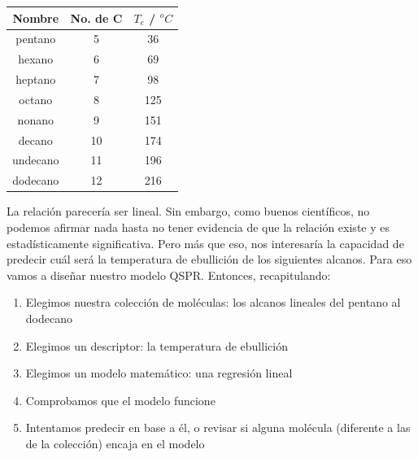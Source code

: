\documentclass[10pt,letterpaper]{article}
\begin{document}
\begin{center}
\begin{tabular}{ccc}
\hline
\textbf{Nombre} & \textbf{No. de C} & \textbf{$T_{e}$ / $^o C$}\\
\hline
pentano & 5 & 36\\
hexano & 6 & 69\\
heptano & 7 & 98\\
octano & 8 & 125\\
nonano & 9 & 151\\
decano & 10 & 174\\
undecano & 11 & 196\\
dodecano & 12 & 216\\
\hline
\end{tabular}
\end{center}

La relaci\'on parecer\'ia ser lineal. Sin embargo, como buenos cient\'ificos, no podemos afirmar nada hasta no tener evidencia de que la relaci\'on existe y es estad\'isticamente significativa. Pero m\'as que eso, nos interesar\'ia la capacidad de predecir cu\'al ser\'a la temperatura de ebullici\'on de los siguientes alcanos. Para eso vamos a dise\~nar nuestro modelo QSPR. Entonces, recapitulando:

\begin{enumerate}
\item Elegimos nuestra colecci\'on de mol\'eculas: los alcanos lineales del pentano al dodecano
\item Elegimos un descriptor: la temperatura de ebullici\'on
\item Elegimos un modelo matem\'atico: una regresi\'on lineal
\item Comprobamos que el modelo funcione
\item Intentamos predecir en base a \'el, o revisar si alguna mol\'ecula (diferente a las de la colecci\'on) encaja en el modelo
\end{enumerate}
\end{document}
